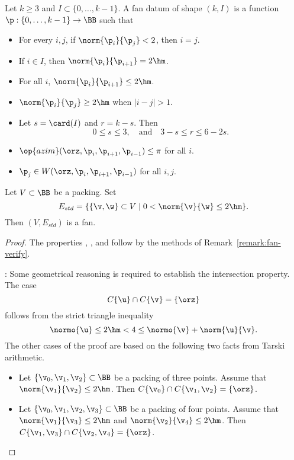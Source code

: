 \begin{definition}
 Let $k\ge3$ and $I\subset
\{0,\ldots,k-1\}$.  A fan datum of shape $(k,I)$ is a function
$\p:\{0,\ldots,k-1\}\to \BB$ such that
\begin{itemize}
\item {} For every $i,j$, if $\norm{\p_i}{\p_j}<2$, then
$i=j$.
\item {} If $i\in I$, then $\norm{\p_i}{\p_{i+1}}=2\hm$.
\item {} For all $i$, $\norm{\p_i}{\p_{i+1}} \le 2\hm$.
\item {}  $\norm{\p_i}{\p_j} \ge 2\hm$ when $|i-j|>1$.
\item {}  Let $s=\card(I)$ and $r=k-s$.  Then 
\begin{displaymath}0\le s \le 3,\quad\text{and}\quad3-s \le r \le 6
- 2s.\end{displaymath}
\item {} $\op{azim}(\orz,\p_i,\p_{i+1},\p_{i-1})\le \pi$ for
all $i$.
\item {} $\p_j\in W(\orz,\p_i,\p_{i+1},\p_{i-1})$ for all $i,j$.
\end{itemize}
\end{definition}

\begin{lemma}[]\label{lemma:std-fan}
Let $V\subset \BB$ be a packing.  Set 
\begin{displaymath}E_{std} = \{\{\v,\w\}\subset V\mid 0 <
\norm{\v}{\w} \le 2\hm\}.\end{displaymath} Then $(V,E_{std})$ is a fan.
\end{lemma}
%

\begin{proof}
The properties , , and  follow
by the methods of Remark~\ref{remark:fan-verify}.

: Some geometrical reasoning is required to
establish the intersection property.  The case
\begin{displaymath}
C\{\u\}\cap C\{\v\} = \{\orz\}
\end{displaymath}
follows from the strict triangle inequality 
\begin{displaymath}
\normo{\u} \le 2\hm < 4 \le \normo{\v} + \norm{\u}{\v}.
\end{displaymath}
The other cases of the proof are based on the following 
two facts from Tarski arithmetic.
\begin{itemize}
\item Let $\{\v_0,\v_1,\v_2\}\subset \BB$ be a packing of three points.
Assume that $\norm{\v_1}{\v_2}\le 2\hm$.  Then
$C\{\v_0\}\cap C\{\v_1,\v_2\} = \{\orz\}$.
\item Let $\{\v_0,\v_1,\v_2,\v_3\}\subset \BB$ be a packing of four
points.  Assume that $\norm{\v_1}{\v_3}\le 2\hm$ and
$\norm{\v_2}{\v_4}\le 2\hm$.  Then $C\{\v_1,\v_3\}\cap
C\{\v_2,\v_4\} = \{\orz\}$.
\end{itemize}
\end{proof}


